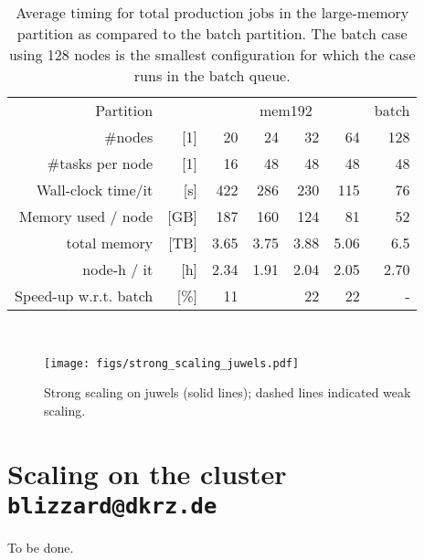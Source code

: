 \begin{table}
  \caption{Average timing for total production jobs in the large-memory partition as compared to the batch partition.
  The batch case using 128 nodes is the smallest configuration for which the case runs in the batch queue. }
  \begin{centering}{\footnotesize\begin{tabular}{rrr|r|rrr}
    \toprule
    Partition               && \multicolumn{4}{c}{mem192}&batch\\
    \#nodes                 &[1]&    20  &  24  &  32 &  64 & 128\\
    \midrule
    \rowcolor{gray!20}\#tasks per node        &[1]&    16  &  48  &  48 &  48 &  48\\
    Wall-clock time/it &[s]      &    422 &  286 & 230 & 115 & 76 \\
    \rowcolor{gray!20} Memory used / node& [GB] &    187 &  160 & 124 &  81 & 52 \\
    total memory & [TB]       &    3.65&  3.75& 3.88& 5.06& 6.5\\
    \rowcolor{gray!20}node-h / it & [h]             &    2.34& 1.91 & 2.04& 2.05& 2.70\\
    \midrule
    Speed-up w.r.t. batch & $[$\%$]$  &    11& \cellcolor{green!62}{\textbf{31}}&22&22&  -\\
    \midrule\bottomrule

  \end{tabular}}\\\end{centering}
  \label{tab:memory_juwels}
\end{table}


\begin{figure}
  \centering\texttt{[image: figs/strong\_scaling\_juwels.pdf]}
  \caption{Strong scaling on juwels (solid lines); dashed lines indicated weak scaling.}
  \label{fig:scaling_juwels}
\end{figure}

\section{Scaling on the cluster \texttt{blizzard@dkrz.de}}

To be done.
